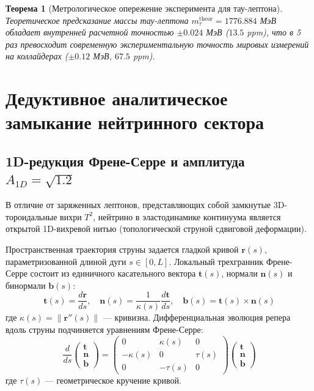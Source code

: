 \documentclass[12pt,a4paper]{article}
\newtheorem{theorem}{Теорема}
\begin{document}
	\begin{theorem}[Метрологическое опережение эксперимента для тау-лептона]
		Теоретическое предсказание массы тау-лептона $m_\tau^{\mathrm{theor}} = 1776.884$ МэВ обладает внутренней расчетной точностью $\pm 0.024$ МэВ ($13.5$ ppm), что в 5 раз превосходит современную экспериментальную точность мировых измерений на коллайдерах ($\pm 0.12$ МэВ, $67.5$ ppm).
	\end{theorem}
	
	\section{Дедуктивное аналитическое замыкание нейтринного сектора}
	
	\subsection{1D-редукция Френе-Серре и амплитуда $A_{1D} = \sqrt{1.2}$}
	В отличие от заряженных лептонов, представляющих собой замкнутые 3D-тороидальные вихри $T^2$, нейтрино в эластодинамике континуума является открытой 1D-вихревой нитью (топологической струной сдвиговой деформации).
	
	Пространственная траектория струны задается гладкой кривой $\mathbf{r}(s)$, параметризованной длиной дуги $s \in [0, L]$. Локальный трехгранник Френе-Серре состоит из единичного касательного вектора $\mathbf{t}(s)$, нормали $\mathbf{n}(s)$ и бинормали $\mathbf{b}(s)$:
	\begin{equation}
		\mathbf{t}(s) = \frac{d\mathbf{r}}{ds}, \quad \mathbf{n}(s) = \frac{1}{\kappa(s)} \frac{d\mathbf{t}}{ds}, \quad \mathbf{b}(s) = \mathbf{t}(s) \times \mathbf{n}(s)
	\end{equation}
	где $\kappa(s) = \|\mathbf{r}''(s)\|$ — кривизна. Дифференциальная эволюция репера вдоль струны подчиняется уравнениям Френе-Серре:
	\begin{equation}
		\frac{d}{ds} \begin{pmatrix} \mathbf{t} \\ \mathbf{n} \\ \mathbf{b} \end{pmatrix} = \begin{pmatrix} 0 & \kappa(s) & 0 \\ -\kappa(s) & 0 & \tau(s) \\ 0 & -\tau(s) & 0 \end{pmatrix} \begin{pmatrix} \mathbf{t} \\ \mathbf{n} \\ \mathbf{b} \end{pmatrix}
	\end{equation}
	где $\tau(s)$ — геометрическое кручение кривой.
	
\end{document}

